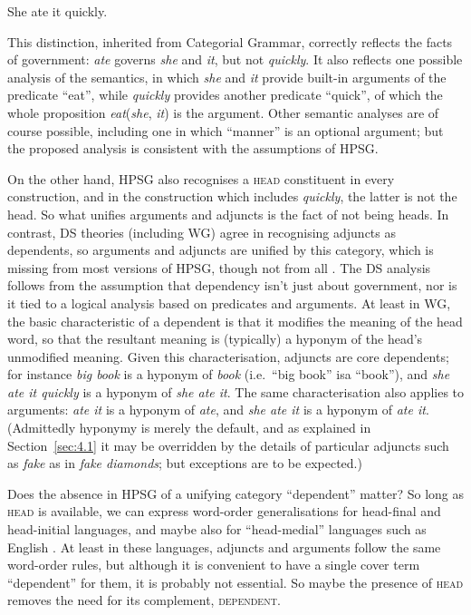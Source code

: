 \documentclass[output=paper
	        ,collection
	        ,collectionchapter
 	        ,biblatex
                ,babelshorthands
                ,newtxmath
                ,draftmode
                ,colorlinks, citecolor=brown
]{langscibook}
\begin{document}
\begin{exe}
	\ex \label{ex:33} She ate it quickly.
\end{exe}

This distinction, inherited from Categorial Grammar, correctly reflects the facts of government: \emph{ate} governs \emph{she} and \emph{it}, but not \emph{quickly}. It also reflects one possible analysis of the semantics, in which \emph{she} and \emph{it} provide built-in arguments of the predicate ``eat'', while \emph{quickly} provides another predicate ``quick'', of which the whole proposition \emph{eat}(\emph{she}, \emph{it}) is the argument. Other semantic analyses are of course possible, including one in which ``manner'' is an optional argument; but the proposed analysis is consistent with the assumptions of HPSG.

On the other hand, HPSG also recognises a \textsc{head} constituent in every construction, and in the construction which includes \emph{quickly}, the latter is not the head. So what unifies arguments and adjuncts is the fact of not being heads. In contrast, DS theories (including WG) agree in recognising adjuncts as dependents, so arguments and adjuncts are unified by this category, which is missing from most versions of HPSG, though not from all \citep{BMS2001a}. The DS analysis follows from the assumption that dependency isn’t just about government, nor is it tied to a logical analysis based on predicates and arguments. At least in WG, the basic characteristic of a dependent is that it modifies the meaning of the head word, so that the resultant meaning is (typically) a hyponym of the head’s unmodified meaning. Given this characterisation, adjuncts are core dependents; for instance \emph{big book} is a hyponym of \emph{book} (i.e.\ ``big book'' isa ``book''), and \emph{she ate it quickly} is a hyponym of \emph{she ate it}. The same characterisation also applies to arguments: \emph{ate it} is a hyponym of \emph{ate}, and \emph{she ate it} is a hyponym of \emph{ate it}. (Admittedly hyponymy is merely the default, and as explained in Section~\ref{sec:4.1} it may be overridden by the details of particular adjuncts such as \emph{fake} as in \emph{fake diamonds}; but exceptions are to be expected.)

Does the absence in HPSG of a unifying category ``dependent'' matter? So long as \textsc{head} is available, we can express word-order generalisations for head-final and head-initial languages, and maybe also for ``head-medial'' languages such as English \citep[172]{Hudson2010b-u}. At least in these languages, adjuncts and arguments follow the same word-order rules, but although it is convenient to have a single cover term ``dependent'' for them, it is probably not essential. So maybe the presence of \textsc{head} removes the need for its complement, \textsc{dependent}.
\end{document}
